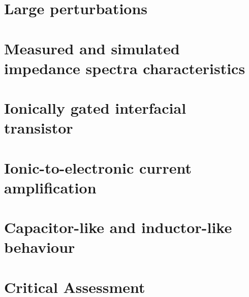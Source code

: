 
\section{Large perturbations}\label{impedance-large_perturbations}




\section{Measured and simulated impedance spectra characteristics}
\section{Ionically gated interfacial transistor}
\section{Ionic-to-electronic current amplification}
\section{Capacitor-like and inductor-like behaviour}
\section{Critical Assessment}

